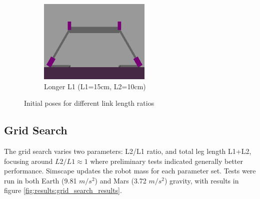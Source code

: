 \begin{figure}[h]
\begin{subfigure}[b]{0.32\textwidth}
        \centering
        \includegraphics[width=\textwidth]{Images/link_length_optimization/longer_L1_pose.png}
        \caption{Longer L1 (L1=15cm, L2=10cm)}
    \end{subfigure}
    \caption{Initial poses for different link length ratios}
    \label{fig:link_length_optimization:initial_poses}
\end{figure}



\subsection{Grid Search}
The grid search varies two parameters: L2/L1 ratio, and total leg length L1+L2, focusing around $L2/L1\approx1$ where preliminary tests indicated generally better performance. Simscape updates the robot mass for each parameter set. Tests were run in both Earth (9.81 $m/s^2$) and Mars (3.72 $m/s^2$) gravity, with results in figure \ref{fig:results:grid_search_results}.



